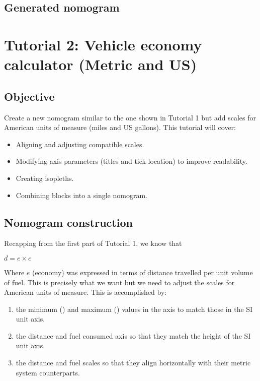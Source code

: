 \documentclass[a4paper,11pt,english]{sphinxmanual}
\begin{document}
\subsection{Generated nomogram}
\label{\detokenize{tutorials/tutorials:id1}}
\noindent{}


\section{Tutorial 2: Vehicle economy calculator (Metric and US)}
\label{\detokenize{tutorials/tutorials:tutorial-2-vehicle-economy-calculator-metric-and-us}}

\subsection{Objective}
\label{\detokenize{tutorials/tutorials:id2}}
Create a new nomogram similar to the one shown in Tutorial 1 but add scales for American units of measure (miles and US gallons).  This tutorial will cover:
\begin{itemize}
\item {} 
Aligning and adjusting compatible scales.

\item {} 
Modifying axis parameters (titles and tick location) to improve readability.

\item {} 
Creating isopleths.

\item {} 
Combining blocks into a single nomogram.

\end{itemize}


\subsection{Nomogram construction}
\label{\detokenize{tutorials/tutorials:id3}}
Recapping from the first part of Tutorial 1, we know that

\(d = {e\times c}\)

Where \(e\) (economy) was expressed in terms of distance travelled per unit volume of fuel.  This is precisely what we want but we need to adjust the scales for American units of measure.  This is accomplished by:
\begin{enumerate}
\def\theenumi{\arabic{enumi}}
\def\labelenumi{\theenumi .}
\makeatletter\def\p@enumii{\p@enumi \theenumi .}\makeatother
\item {} 
 the minimum () and maximum () values in the axis to match those in the SI unit axis.

\item {} 
 the distance and fuel consumed axis so that they match the height of the SI unit axis.

\item {} 
 the distance and fuel scales so that they align horizontally with their metric system counterparts.

\end{enumerate}
\end{document}
